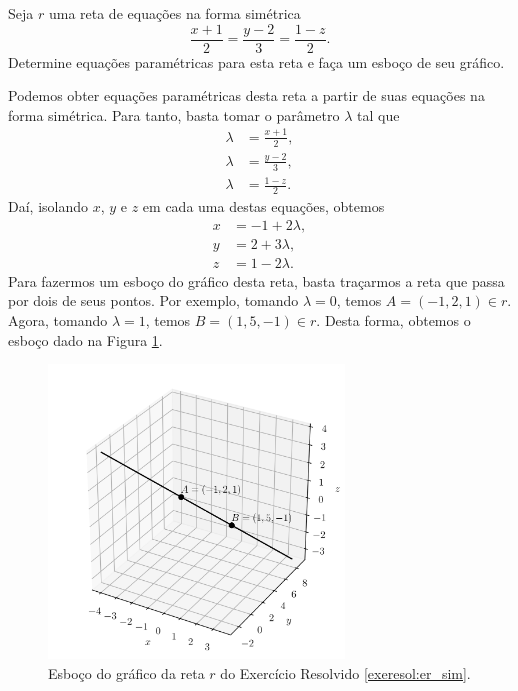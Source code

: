 \begin{exeresol}\label{exeresol:er_sim}
  Seja $r$ uma reta de equações na forma simétrica
  \begin{equation}
    \frac{x+1}{2} = \frac{y-2}{3} = \frac{1-z}{2}.
  \end{equation}
  Determine equações paramétricas para esta reta e faça um esboço de seu gráfico.
\end{exeresol}
\begin{resol}
  Podemos obter equações paramétricas desta reta a partir de suas equações na forma simétrica. Para tanto, basta tomar o parâmetro $\lambda$ tal que
  \begin{align}
    \lambda &= \frac{x+1}{2},\\
    \lambda &= \frac{y-2}{3},\\
    \lambda &= \frac{1-z}{2}.
  \end{align}
  Daí, isolando $x$, $y$ e $z$ em cada uma destas equações, obtemos
  \begin{align}
    x &= -1 + 2\lambda,\\
    y &= 2 + 3\lambda,\\
    z &= 1 - 2\lambda.
  \end{align}
  Para fazermos um esboço do gráfico desta reta, basta traçarmos a reta que passa por dois de seus pontos. Por exemplo, tomando $\lambda = 0$, temos $A = (-1,2,1)\in r$. Agora, tomando $\lambda = 1$, temos $B = (1,5,-1)\in r$. Desta forma, obtemos o esboço dado na Figura \ref{fig:exeresol_er_sim}.

  \begin{figure}[H]
    \centering
    \includegraphics[width=0.7\textwidth]{./cap_er/dados/fig_exeresol_er_sim/fig_exeresol_er_sim}
    \caption{Esboço do gráfico da reta $r$ do Exercício Resolvido \ref{exeresol:er_sim}.}
    \label{fig:exeresol_er_sim}
  \end{figure}
\end{resol}

